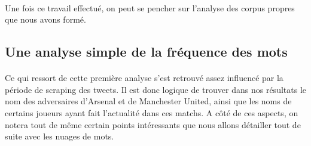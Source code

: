 \documentclass[14pt, openany]{article}
\begin{document}
\paragraph{}
Une fois ce travail effectué, on peut se pencher sur l'analyse des corpus \og propres \fg{} que nous avons formé.
\subsection{Une analyse simple de la fréquence des mots}
\paragraph{}
Ce qui ressort de cette première analyse s'est retrouvé assez influencé par la période de scraping des tweets. Il est donc logique de trouver dans nos résultats le nom des adversaires d'Arsenal et de Manchester United, ainsi que les noms de certains joueurs ayant fait l'actualité dans ces matchs. A côté de ces aspects, on notera tout de même certain points intéressants que nous allons détailler tout de suite avec les nuages de mots.
\end{document}
